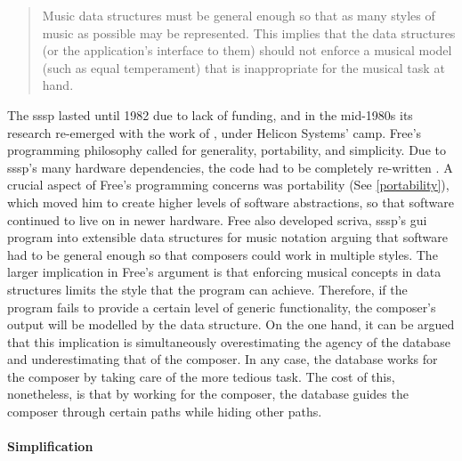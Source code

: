 \documentclass[
]{book}
\newcommand{\see}[1]{(See \ref{#1})}
\begin{document}
\begin{quote}
	Music data structures must be general enough so that as many styles of music as possible may be represented. This implies that the data structures (or the application's interface to them) should not enforce a musical model (such as equal temperament) that is inappropriate for the musical task at hand. \parencite[318]{icmc/bbp2372.1987.046}
\end{quote}

The \gls{sssp} lasted until 1982 due to lack of funding, and in the mid-1980s its research re-emerged with the work of \textcites{DBLP:conf/icmc/FreeV86}{icmc/bbp2372.1987.046}{DBLP:conf/icmc/FreeV88}, under Helicon Systems' \gls{camp}. Free's programming philosophy called for generality, portability, and simplicity. Due to \gls{sssp}'s many hardware dependencies, the code had to be completely re-written \parencite{DBLP:conf/icmc/FreeV86}. A crucial aspect of Free's programming concerns was portability \see{portability}, which moved him to create higher levels of software abstractions, so that software continued to live on in newer hardware. Free also developed \gls{scriva}, \gls{sssp}'s \gls{gui} program into extensible data structures for music notation arguing that software had to be general enough so that composers could work in multiple styles. The larger implication in Free's argument is that enforcing musical concepts in data structures limits the style that the program can achieve. Therefore, if the program fails to provide a certain level of generic functionality, the composer's output will be modelled by the data structure. On the one hand, it can be argued that this implication is simultaneously overestimating the agency of the database and underestimating that of the composer. In any case, the database works for the composer by taking care of the more tedious task. The cost of this, nonetheless, is that by working for the composer, the database guides the composer through certain paths while hiding other paths.

\paragraph{Simplification}
\label{computer:vanilla}
\end{document}
